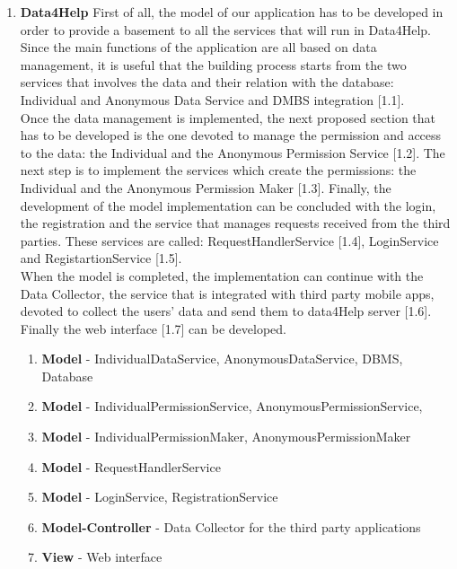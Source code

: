 \documentclass[a4paper]{article}
\begin{document}
\begin{enumerate}[label*=\bf{\arabic*.}]

\item \textbf{Data4Help} First of all, the model of our application has to be developed in order to provide a basement to all the services that will run in Data4Help. Since the main functions of the application are all based on data management, it is useful that the building process starts from the two services that involves the data and their relation with the database: Individual and Anonymous Data Service and DMBS integration [1.1].\\
Once the data management is implemented, the next proposed section that has to be developed is the one devoted to manage the permission and access to the data: the Individual and the Anonymous Permission Service [1.2].
The next step is to implement the services which create the permissions: the Individual and the Anonymous Permission Maker [1.3]. Finally, the development of the model implementation can be concluded with the login, the registration and the service that manages requests received from the third parties. These services are called: RequestHandlerService [1.4], LoginService and RegistartionService [1.5].\\
When the model is completed, the implementation can continue with the Data Collector, the service that is integrated with third party mobile apps, devoted to collect the users' data and send them to data4Help server [1.6].\\ 
Finally the web interface [1.7] can be developed.


\begin{enumerate}[label*=\bf{\arabic*}]
    \item \textbf{Model} - IndividualDataService, AnonymousDataService, DBMS, Database
    \item \textbf{Model} - IndividualPermissionService, AnonymousPermissionService, 
    \item \textbf{Model} - IndividualPermissionMaker, AnonymousPermissionMaker
    \item \textbf{Model} - RequestHandlerService
    \item \textbf{Model} - LoginService, RegistrationService
    \item \textbf{Model-Controller} - Data Collector for the third party applications
    \item \textbf{View} - Web interface
\end{enumerate}


\end{enumerate}
\end{document}
